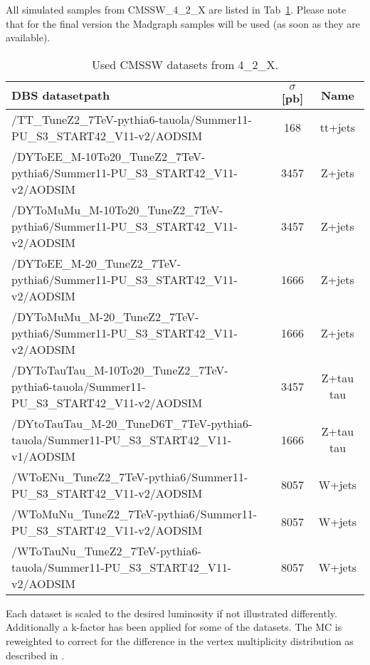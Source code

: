 All simulated samples from CMSSW\_4\_2\_X are listed in Tab~\ref{tab:alldataset}. 
Please note that for the
final version the Madgraph samples will be used (as soon as they are 
available).
 
\begin{table}[htdp]
\caption{Used CMSSW datasets from 4\_2\_X.}
\label{tab:alldataset}
\begin{center}
\begin{tabular}{|l||c|c|} \hline
 	DBS datasetpath 		&   $\sigma$ [pb] & Name\\ \hline \hline
/TT\_TuneZ2\_7TeV-pythia6-tauola/Summer11-PU\_S3\_START42\_V11-v2/AODSIM & 168& tt+jets\\ \hline
/DYToEE\_M-10To20\_TuneZ2\_7TeV-pythia6/Summer11-PU\_S3\_START42\_V11-v2/AODSIM& 3457& Z+jets\\ \hline
/DYToMuMu\_M-10To20\_TuneZ2\_7TeV-pythia6/Summer11-PU\_S3\_START42\_V11-v2/AODSIM& 3457& Z+jets\\ \hline
/DYToEE\_M-20\_TuneZ2\_7TeV-pythia6/Summer11-PU\_S3\_START42\_V11-v2/AODSIM& 1666& Z+jets\\ \hline
/DYToMuMu\_M-20\_TuneZ2\_7TeV-pythia6/Summer11-PU\_S3\_START42\_V11-v2/AODSIM& 1666& Z+jets\\ \hline
/DYToTauTau\_M-10To20\_TuneZ2\_7TeV-pythia6-tauola/Summer11-PU\_S3\_START42\_V11-v2/AODSIM& 3457& Z+tau tau\\ \hline
/DYtoTauTau\_M-20\_TuneD6T\_7TeV-pythia6-tauola/Summer11-PU\_S3\_START42\_V11-v1/AODSIM& 1666& Z+tau tau\\ \hline
/WToENu\_TuneZ2\_7TeV-pythia6/Summer11-PU\_S3\_START42\_V11-v2/AODSIM & 8057& W+jets\\ \hline
/WToMuNu\_TuneZ2\_7TeV-pythia6/Summer11-PU\_S3\_START42\_V11-v2/AODSIM & 8057& W+jets\\ \hline
/WToTauNu\_TuneZ2\_7TeV-pythia6-tauola/Summer11-PU\_S3\_START42\_V11-v2/AODSIM & 8057& W+jets\\ \hline
\end{tabular}
\end{center}
\end{table}

Each dataset is scaled to the desired luminosity if not illustrated differently. 
Additionally a k-factor has been applied for some of the datasets.
The MC is reweighted to correct for the difference in the vertex
multiplicity distribution as described in \cite{pileup}.


